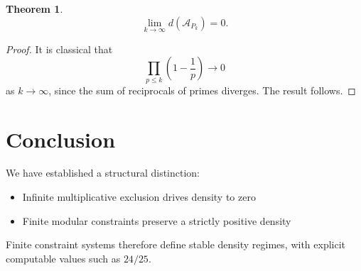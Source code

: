 \documentclass[11pt]{article}
\theoremstyle{plain}
\newtheorem{theorem}{Theorem}
\begin{document}
\begin{theorem}
\[
\lim_{k \to \infty} d(\mathcal{A}_{P_k}) = 0.
\]
\end{theorem}

\begin{proof}
It is classical that
\[
\prod_{p \leq k} \left(1 - \frac{1}{p}\right) \to 0
\]
as $k \to \infty$, since the sum of reciprocals of primes diverges. The result follows.
\end{proof}

\section{Conclusion}

We have established a structural distinction:

\begin{itemize}
    \item Infinite multiplicative exclusion drives density to zero
    \item Finite modular constraints preserve a strictly positive density
\end{itemize}

Finite constraint systems therefore define stable density regimes, with explicit computable values such as $24/25$.
\end{document}
